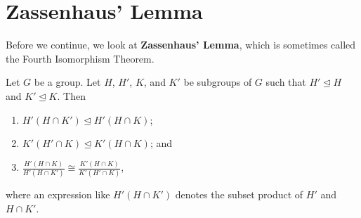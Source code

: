 \section{Zassenhaus' Lemma}
Before we continue, we look at \textbf{Zassenhaus' Lemma}, which is sometimes called the Fourth Isomorphism Theorem.
\begin{lemma}[Zassenhaus]\label{lemma-zassenhaus}
    Let $G$ be a group. Let $H$, $H'$, $K$, and $K'$ be subgroups of $G$ such that $H' \unlhd H$ and $K' \unlhd K$. Then
    \begin{enumerate}
        \item $H'(H \cap K') \unlhd H' (H \cap K)$;
        \item $K'(H' \cap K) \unlhd K' (H \cap K)$; and
        \item $\frac{H'(H\cap K)}{H'(H\cap K')} \cong \frac{K'(H\cap K)}{K'(H'\cap K)}$,
    \end{enumerate}
    where an expression like $H'(H \cap K')$ denotes the subset product of $H'$ and $H \cap K'$.
\end{lemma}
